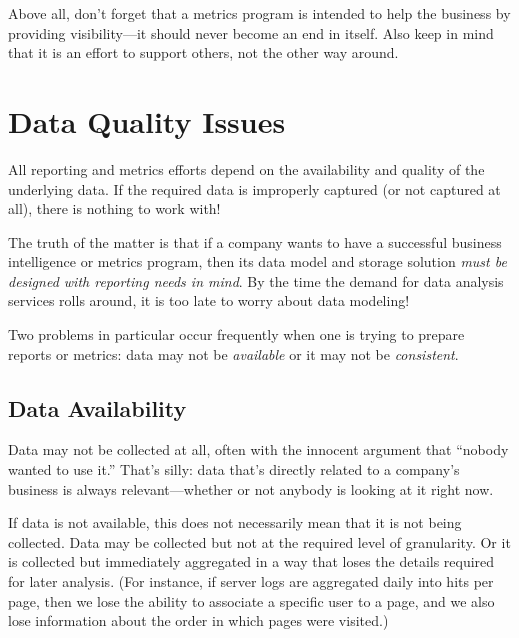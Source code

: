     
Above all, don't forget that a metrics program is intended to help the
business by providing visibility---it should never become an end in
itself. Also keep in mind that it is an effort to support others, not
the other way around.


\section{Data Quality Issues}


All reporting and metrics efforts depend on the availability and
quality of the underlying data. If the required data is improperly
captured (or not captured at all), there is nothing to work with!

The truth of the matter is that if a company wants to have a
successful business intelligence or metrics program, then its data
model and storage solution \emph{must be designed with reporting needs
  in mind}. By the time the demand for data analysis services rolls
around, it is too late to worry about data modeling!

Two problems in particular occur frequently when one is trying to
prepare reports or metrics: data may not be \emph{available} or it may
not be \emph{consistent}.

\vspace*{-6pt}
\subsection{Data Availability}

 
Data may not be collected at all, often with the innocent argument
that ``nobody wanted to use it.'' That's silly: data that's directly
related to a company's business is always relevant---whether or not
anybody is looking at it right now.

If data is not available, this does not necessarily mean that it is
not being collected. Data may be collected but not at the required
level of granularity. Or it is collected but immediately aggregated in
a way that\vadjust{\pagebreak} loses the details required for later analysis. (For
instance, if server logs are aggregated daily into hits per page, then
we lose the ability to associate a specific user to a page, and we also
lose information about the order in which pages were visited.)
    
